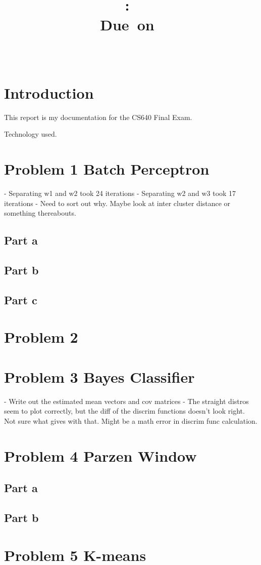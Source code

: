 \documentclass{article}
\title{\vspace{2in}\textmd{\textbf{\hmwkClass:\ \hmwkTitle\ifthenelse{\equal{\hmwkSubTitle}{}}{}{\\\hmwkSubTitle}}}\\\normalsize\vspace{0.1in}\small{Due\ on\ \hmwkDueDate}\\\vspace{0.1in}\large{\textit{\hmwkClassInstructor\ \hmwkClassTime}}\vspace{3in}}
\date{}
\author{\textbf{\hmwkAuthorName}}
\begin{document}
\maketitle

\section*{Introduction}
This report is my documentation for the CS640 Final Exam.

Technology used.

\section*{Problem 1 Batch Perceptron}
- Separating w1 and w2 took 24 iterations
- Separating w2 and w3 took 17 iterations
- Need to sort out why.  Maybe look at inter cluster distance or
  something thereabouts.

\subsection*{Part a}
\subsection*{Part b}
\subsection*{Part c}

\section*{Problem 2}

\section*{Problem 3 Bayes Classifier}
- Write out the estimated mean vectors and cov matrices
- The straight distros seem to plot correctly, but the diff
  of the discrim functions doesn't look right.  Not sure
  what gives with that.  Might be a math error in discrim
  func calculation.

\section*{Problem 4 Parzen Window}
\subsection*{Part a}
\subsection*{Part b}

\section*{Problem 5 K-means}
\end{document}

